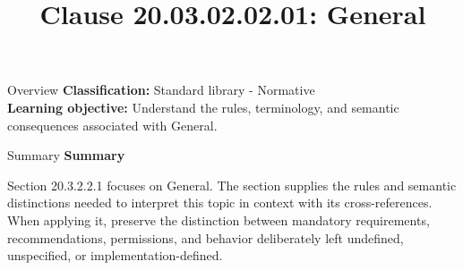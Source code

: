 \documentclass[10pt,letterpaper]{article}
\title{Clause 20.03.02.02.01: General}
\author{}
\date{}
\begin{document}
\maketitle
\begin{CornellOverviewBox}{Overview}
\textbf{Classification:} Standard library - Normative\\[2pt]
\textbf{Learning objective:} Understand the rules, terminology, and semantic consequences associated with General.
\end{CornellOverviewBox}\begin{CornellSummaryBox}{Summary}
{\sffamily\bfseries\color{Accent} Summary}\par\vspace{3pt}Section 20.3.2.2.1 focuses on General. The section supplies the rules and semantic distinctions needed to interpret this topic in context with its cross-references. When applying it, preserve the distinction between mandatory requirements, recommendations, permissions, and behavior deliberately left undefined, unspecified, or implementation-defined.
\end{CornellSummaryBox}
\end{document}
